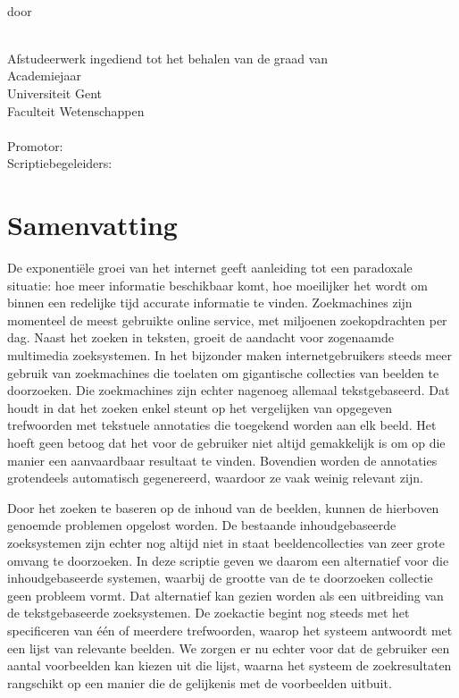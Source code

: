 \newpage
\thispagestyle{plain}

\begin{center}
{\sf\huge \titel }\\[3mm]
door\\
{\Large\auteur{}} \\
\end{center}
\noindent Afstudeerwerk ingediend tot het behalen van de graad van
\richting
\vspace{3mm}\\
Academiejaar \jaar
\vspace{3mm}\\
\noindent Universiteit Gent\\
Faculteit Wetenschappen\\
\vspace{3mm}\\
\noindent Promotor: \promotor\\
\noindent Scriptiebegeleiders: \begeleider\\
\vfill

\section*{Samenvatting}
De exponenti\"ele groei van het internet geeft aanleiding tot een paradoxale
situatie: hoe meer informatie beschikbaar komt, hoe moeilijker het wordt
om binnen een redelijke tijd accurate informatie te vinden. Zoekmachines zijn momenteel
de meest gebruikte online service, met miljoenen zoekopdrachten per dag. Naast het zoeken
in teksten, groeit de aandacht voor zogenaamde multimedia zoeksystemen. 
In het bijzonder maken internetgebruikers steeds meer gebruik van zoekmachines die toelaten om 
gigantische collecties van beelden te doorzoeken. Die zoekmachines zijn echter nagenoeg 
allemaal tekstgebaseerd. Dat houdt in dat het zoeken enkel steunt op het vergelijken van opgegeven 
trefwoorden met tekstuele annotaties die toegekend worden aan elk beeld. Het hoeft geen
betoog dat het voor de gebruiker niet altijd gemakkelijk is om op die manier een aanvaardbaar 
resultaat te vinden. Bovendien worden de annotaties grotendeels automatisch gegenereerd, 
waardoor ze vaak weinig relevant zijn.

Door het zoeken te baseren op de inhoud van de beelden, kunnen de hierboven genoemde problemen 
opgelost worden. De bestaande inhoudgebaseerde zoeksystemen zijn echter nog altijd niet 
in staat beeldencollecties van zeer grote omvang te doorzoeken. In deze scriptie geven 
we daarom een alternatief voor die inhoudgebaseerde systemen, waarbij de grootte van 
de te doorzoeken collectie geen probleem vormt. 
Dat alternatief kan gezien worden als een uitbreiding van de tekstgebaseerde zoeksystemen.
De zoekactie begint nog steeds met het specificeren van \'e\'en of meerdere trefwoorden, waarop
het systeem antwoordt met een lijst van relevante beelden. We zorgen er nu echter voor
dat de gebruiker een aantal voorbeelden kan kiezen uit die lijst, waarna het
systeem de zoekresultaten rangschikt op een manier die de gelijkenis met de voorbeelden uitbuit.

